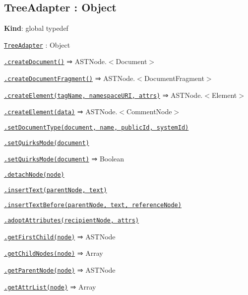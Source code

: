 \label{_TreeAdapter}%
 \subsection*{Tree\+Adapter \+: {\ttfamily Object}}

{\bfseries Kind}\+: global typedef


\begin{DoxyItemize}
\item \href{#TreeAdapter}{\tt Tree\+Adapter} \+: {\ttfamily Object}
\begin{DoxyItemize}
\item \href{#TreeAdapter.createDocument}{\tt .create\+Document()} ⇒ {\ttfamily A\+S\+T\+Node.$<$Document$>$}
\item \href{#TreeAdapter.createDocumentFragment}{\tt .create\+Document\+Fragment()} ⇒ {\ttfamily A\+S\+T\+Node.$<$Document\+Fragment$>$}
\item \href{#TreeAdapter.createElement}{\tt .create\+Element(tag\+Name, namespace\+U\+R\+I, attrs)} ⇒ {\ttfamily A\+S\+T\+Node.$<$Element$>$}
\item \href{#TreeAdapter.createElement}{\tt .create\+Element(data)} ⇒ {\ttfamily A\+S\+T\+Node.$<$Comment\+Node$>$}
\item \href{#TreeAdapter.setDocumentType}{\tt .set\+Document\+Type(document, name, public\+Id, system\+Id)}
\item \href{#TreeAdapter.setQuirksMode}{\tt .set\+Quirks\+Mode(document)}
\item \href{#TreeAdapter.setQuirksMode}{\tt .set\+Quirks\+Mode(document)} ⇒ {\ttfamily Boolean}
\item \href{#TreeAdapter.detachNode}{\tt .detach\+Node(node)}
\item \href{#TreeAdapter.insertText}{\tt .insert\+Text(parent\+Node, text)}
\item \href{#TreeAdapter.insertTextBefore}{\tt .insert\+Text\+Before(parent\+Node, text, reference\+Node)}
\item \href{#TreeAdapter.adoptAttributes}{\tt .adopt\+Attributes(recipient\+Node, attrs)}
\item \href{#TreeAdapter.getFirstChild}{\tt .get\+First\+Child(node)} ⇒ {\ttfamily A\+S\+T\+Node}
\item \href{#TreeAdapter.getChildNodes}{\tt .get\+Child\+Nodes(node)} ⇒ {\ttfamily Array}
\item \href{#TreeAdapter.getParentNode}{\tt .get\+Parent\+Node(node)} ⇒ {\ttfamily A\+S\+T\+Node}
\item \href{#TreeAdapter.getAttrList}{\tt .get\+Attr\+List(node)} ⇒ {\ttfamily Array}

\end{DoxyItemize}
\end{DoxyItemize}
